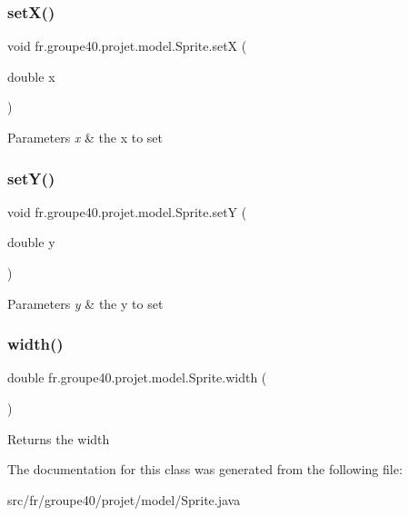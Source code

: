 \subsubsection{\texorpdfstring{set\+X()}{setX()}}
{\footnotesize\ttfamily void fr.\+groupe40.\+projet.\+model.\+Sprite.\+setX (\begin{DoxyParamCaption}\item[{double}]{x }\end{DoxyParamCaption})}


\begin{DoxyParams}{Parameters}
{\em x} & the x to set \\
\hline
\end{DoxyParams}
\mbox{\label{classfr_1_1groupe40_1_1projet_1_1model_1_1_sprite_a95a46d20a0736d4d9138c2e865fd0c1d}} 
\subsubsection{\texorpdfstring{set\+Y()}{setY()}}
{\footnotesize\ttfamily void fr.\+groupe40.\+projet.\+model.\+Sprite.\+setY (\begin{DoxyParamCaption}\item[{double}]{y }\end{DoxyParamCaption})}


\begin{DoxyParams}{Parameters}
{\em y} & the y to set \\
\hline
\end{DoxyParams}
\mbox{\label{classfr_1_1groupe40_1_1projet_1_1model_1_1_sprite_a9c9d69c95176ab9663f7b2beb64d6a2d}} 
\subsubsection{\texorpdfstring{width()}{width()}}
{\footnotesize\ttfamily double fr.\+groupe40.\+projet.\+model.\+Sprite.\+width (\begin{DoxyParamCaption}{ }\end{DoxyParamCaption})}

\begin{DoxyReturn}{Returns}
the width 
\end{DoxyReturn}


The documentation for this class was generated from the following file\+:\begin{DoxyCompactItemize}
\item 
src/fr/groupe40/projet/model/Sprite.\+java\end{DoxyCompactItemize}
